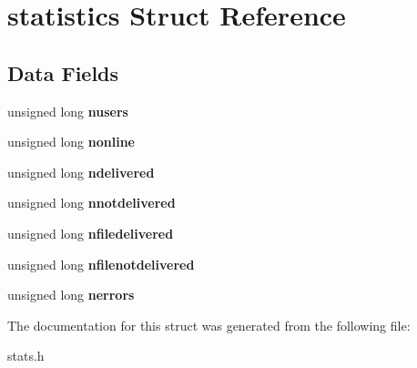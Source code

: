 \hypertarget{structstatistics}{}\section{statistics Struct Reference}
\label{structstatistics}
\subsection*{Data Fields}
\begin{DoxyCompactItemize}
\item 
\mbox{\label{structstatistics_adacd907234b18252c5e1ec947deca41f}} 
unsigned long {\bfseries nusers}
\item 
\mbox{\label{structstatistics_aff99cf9b6aa2d22f48f543a906603ae7}} 
unsigned long {\bfseries nonline}
\item 
\mbox{\label{structstatistics_a08e845e3d8ec6f288e20a4693ff09123}} 
unsigned long {\bfseries ndelivered}
\item 
\mbox{\label{structstatistics_a544cca2dcba9741ea008e54ab3b4eef8}} 
unsigned long {\bfseries nnotdelivered}
\item 
\mbox{\label{structstatistics_a0b799597236f59771d2df823cc295de1}} 
unsigned long {\bfseries nfiledelivered}
\item 
\mbox{\label{structstatistics_a3f46d11b2e9a9b2cf0294f5f55fe3d32}} 
unsigned long {\bfseries nfilenotdelivered}
\item 
\mbox{\label{structstatistics_a6b8853d9bf908c15a1c6444ac8e62c20}} 
unsigned long {\bfseries nerrors}
\end{DoxyCompactItemize}


The documentation for this struct was generated from the following file\+:\begin{DoxyCompactItemize}
\item 
stats.\+h\end{DoxyCompactItemize}
